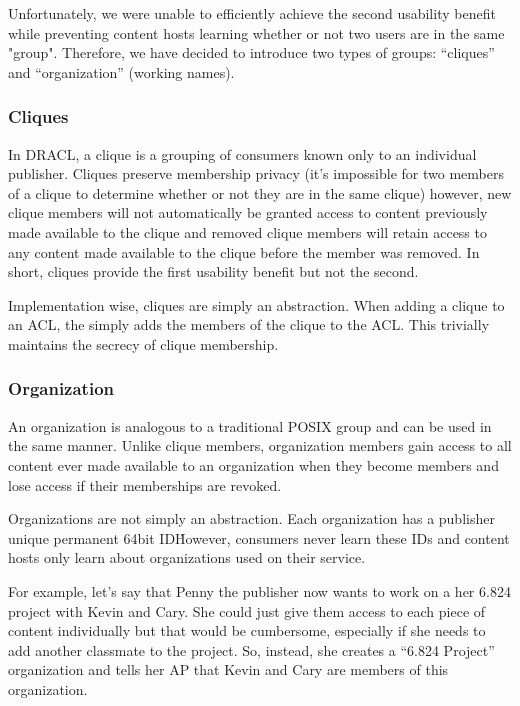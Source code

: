 \documentclass[pdftex,12pt,a4papaer]{article}
\begin{document}
Unfortunately, we were unable to efficiently achieve the second usability
benefit while preventing content hosts learning whether or not two users are in
the same "group". Therefore, we have decided to introduce two types of groups:
``cliques'' and ``organization'' (working names).

\subsubsection{Cliques}

In DRACL, a clique is a grouping of consumers known only to an individual
publisher. Cliques preserve membership privacy (it's impossible for two members
of a clique to determine whether or not they are in the same clique) however,
new clique members will not automatically be granted access to content
previously made available to the clique and removed clique members will retain
access to any content made available to the clique before the member was
removed. In short, cliques provide the first usability benefit but not the
second.

Implementation wise, cliques are simply an abstraction. When adding a clique to
an ACL, the simply adds the members of the clique to the ACL\@. This
trivially maintains the secrecy of clique membership.

\subsubsection{Organization}

An organization is analogous to a traditional POSIX group and can be used in the
same manner. Unlike clique members, organization members gain access to all
content ever made available to an organization when they become members and
lose access if their memberships are revoked.

Organizations are not simply an abstraction. Each organization has a publisher
unique permanent 64bit ID\. However, consumers never learn these IDs and content
hosts only learn about organizations used on their service. %

For example, let's say that Penny the publisher now wants to work on a her 6.824
project with Kevin and Cary. She could just give them access to each piece of
content individually but that would be cumbersome, especially if she needs to
add another classmate to the project. So, instead, she creates a ``6.824
Project'' organization and tells her AP that Kevin and Cary are members of this
organization.
\end{document}
